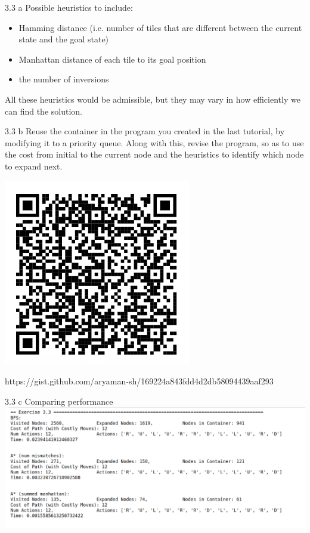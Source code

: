 \documentclass[11pt]{beamer}
\begin{document}
\begin{frame}{3.3 a}
Possible heuristics to include: \pause
\begin{itemize}
	\item Hamming distance (i.e. number of tiles that are different between the current state and the goal state)\pause
	\item Manhattan distance of each tile to its goal position \pause
	\item the number of inversions\pause
\end{itemize}
All these heuristics would be admissible, but they may vary in how efficiently we can find the solution.
\end{frame}

\begin{frame}{3.3 b}
Reuse the container in the program you created in the last tutorial, by modifying it to a priority queue.
Along with this, revise the program, so as to use the cost from initial to the current node and the
heuristics to identify which node to expand next. \pause
\begin{center}
\includegraphics[scale=0.4]{33code.png}
\end{center}
https://gist.github.com/aryaman-sh/169224a843fdd4d2db58094439aaf293
\end{frame}

\begin{frame}{3.3 c}
Comparing performance\\

\includegraphics[scale=0.25]{33results.png}
\end{frame}
\end{document}
